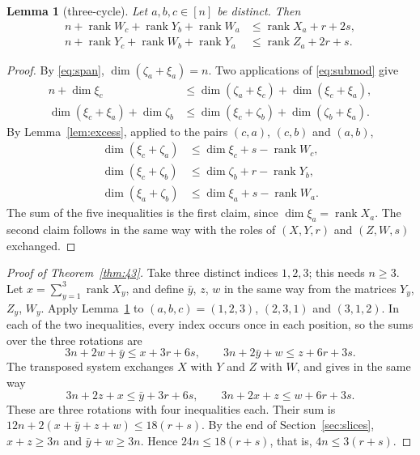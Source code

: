 \documentclass[11pt]{amsart}
\newtheorem{lemma}[theorem]{Lemma}
\theoremstyle{remark}
\newcommand{\rk}{\operatorname{rank}}
\begin{document}
\begin{lemma}[three-cycle]\label{lem:cycle}
Let $a,b,c\in[n]$ be distinct. Then
\begin{align*}
  n+\rk W_c+\rk Y_b+\rk W_a&\le\rk X_a+r+2s,\\
  n+\rk Y_c+\rk W_b+\rk Y_a&\le\rk Z_a+2r+s.
\end{align*}
\end{lemma}

\begin{proof}
By \eqref{eq:span}, $\dim(\zeta_a+\xi_a)=n$. Two applications of \eqref{eq:submod} give
\begin{align*}
  n+\dim\xi_c&\le\dim(\zeta_a+\xi_c)+\dim(\xi_c+\xi_a),\\
  \dim(\xi_c+\xi_a)+\dim\zeta_b&\le\dim(\xi_c+\zeta_b)+\dim(\zeta_b+\xi_a).
\end{align*}
By Lemma~\ref{lem:excess}, applied to the pairs $(c,a)$, $(c,b)$ and $(a,b)$,
\begin{align*}
  \dim(\xi_c+\zeta_a)&\le\dim\xi_c+s-\rk W_c,\\
  \dim(\xi_c+\zeta_b)&\le\dim\zeta_b+r-\rk Y_b,\\
  \dim(\xi_a+\zeta_b)&\le\dim\xi_a+s-\rk W_a.
\end{align*}
The sum of the five inequalities is the first claim, since $\dim\xi_a=\rk X_a$. The second claim follows in
the same way with the roles of $(X,Y,r)$ and $(Z,W,s)$ exchanged.
\end{proof}

\begin{proof}[Proof of Theorem~\ref{thm:43}]
Take three distinct indices $1,2,3$; this needs $n\ge3$. Let $x=\sum_{y=1}^3\rk X_y$, and define $\bar y$,
$z$, $w$ in the same way from the matrices $Y_y$, $Z_y$, $W_y$. Apply Lemma~\ref{lem:cycle} to
$(a,b,c)=(1,2,3)$, $(2,3,1)$ and $(3,1,2)$. In each of the two inequalities, every index occurs once in each
position, so the sums over the three rotations are
\[
  3n+2w+\bar y\le x+3r+6s,\qquad 3n+2\bar y+w\le z+6r+3s.
\]
The transposed system exchanges $X$ with $Y$ and $Z$ with $W$, and gives in the same way
\[
  3n+2z+x\le\bar y+3r+6s,\qquad 3n+2x+z\le w+6r+3s.
\]
These are three rotations with four inequalities each. Their sum is
$12n+2(x+\bar y+z+w)\le18(r+s)$. By the end of Section~\ref{sec:slices}, $x+z\ge3n$ and $\bar y+w\ge3n$.
Hence $24n\le18(r+s)$, that is, $4n\le3(r+s)$.
\end{proof}
\end{document}
